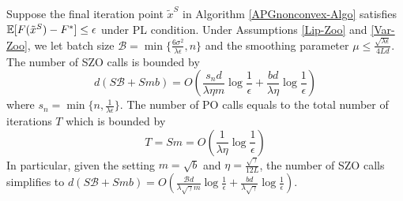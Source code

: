 \begin{corollary}\label{PL-Zo-Cor}
Suppose the final iteration point $\tilde{x}^S$ in Algorithm \ref{APGnonconvex-Algo} satisfies $\mathbb{E}[F(\tilde{x}^S) - F^*]\leq \epsilon$ under PL condition. Under Assumptions \ref{Lip-Zoo} and \ref{Var-Zoo}, we let batch size $\mathcal{B} = \min\{\frac{6\sigma^2}{\lambda\epsilon},n\}$ and the smoothing parameter $\mu \leq \frac{\sqrt{\lambda\epsilon}}{4 L d}$. The number of SZO calls is bounded by
\[
d(S\mathcal{B}+Smb) = O(\frac{s_n d}{\lambda\eta m}\log\frac{1}{\epsilon}+\frac{b d}{\lambda\eta}\log\frac{1}{\epsilon})
\]
where $s_n = \min \{n,\frac{1}{\lambda \epsilon}\}$.
The number of PO calls equals to the total number of iterations $T$ which is bounded by
\[
 T = Sm = O(\frac{1}{\lambda\eta}\log\frac{1}{\epsilon})
\]
In particular, given the setting  $m=\sqrt{b}$ and $\eta = \frac{\sqrt{\gamma}}{12 L}$, the number of SZO calls  simplifies to 
$d(S\mathcal{B}+Smb) = O(\frac{\mathcal{B}d}{\lambda\sqrt{\gamma} m}\log\frac{1}{\epsilon}+\frac{bd}{\lambda\sqrt{\gamma}}\log\frac{1}{\epsilon})$.
\end{corollary}
\iffalse
Corollary \ref{PL-Zo-Cor} indicates that leveraging the PL condition improves the dominant convergence rate, where the error of
order $O(1/\epsilon)$ in Corollary \ref{corr11} is amended to $O(\log(1/\epsilon))$, leading to a significant speed up.
Compared to the sub-linear convergence rate for ZO algorithms in \cite{duchi2015optimal,nesterov2017random,liu2018zeroth}, the convergence performance of PSVRG+ under PL condition has a global linear convergence rate and therefore requires lower number of ZO oracle calls. 
This also indicates that if ZO-PSVRG+ is initialized in a generic non-convex domain, it can automatically achieve an accelerated  convergence rate due to getting into a PL area. It is an improved result compared with \cite{reddi2016stochastic} where they applied PL-SVRG/SAGA to restart ProxSVRG/SAGA in order to obtain a linear convergence rate under PL condition.
In addition, note that the convergence analysis under PL condition in \cite{ji2019improved} has complex coupling structures which makes it hard to apply from practical perspective while our proof is simple and the parameters are directly specified.
\fi

